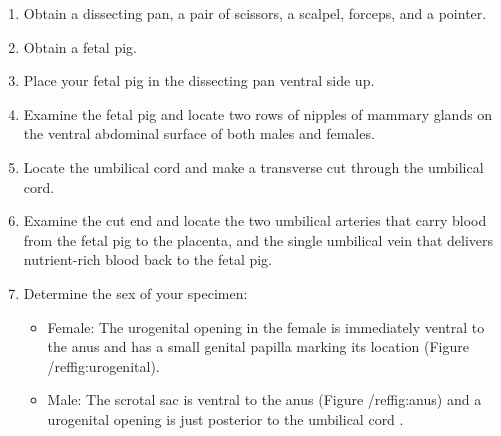 \begin{enumerate}
\def\labelenumi{\arabic{enumi}.}
\tightlist
\item
  Obtain a dissecting pan, a pair of scissors, a scalpel, forceps, and a pointer.
\item
  Obtain a fetal pig.
\item
  Place your fetal pig in the dissecting pan ventral side up.
\item
  Examine the fetal pig and locate two rows of nipples of mammary glands on the ventral abdominal
  surface of both males and females.
\item
  Locate the umbilical cord and make a transverse cut through the umbilical cord.
\item
  Examine the cut end and locate the two umbilical arteries that carry blood from the fetal pig to the placenta, and the single umbilical vein that delivers nutrient-rich blood back to the fetal pig.
\item
  Determine the sex of your specimen:

  \begin{itemize}
  \tightlist
  \item
    Female: The urogenital opening in the female is immediately ventral to the anus and has a small genital papilla marking its location (Figure /ref{fig:urogenital}).
  \item
    Male: The scrotal sac is ventral to the anus (Figure /ref{fig:anus}) and a urogenital opening is just posterior to the umbilical cord .
  \end{itemize}


\end{enumerate}
